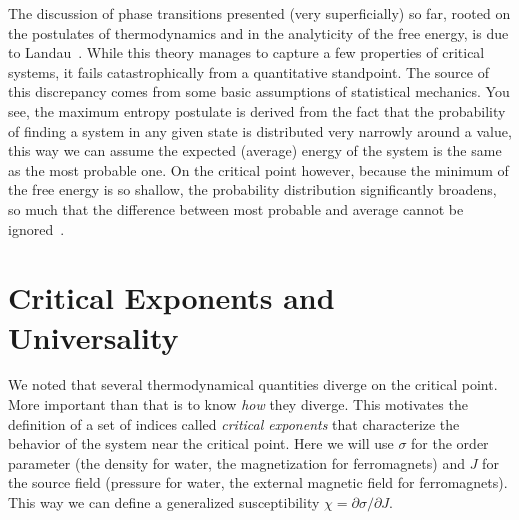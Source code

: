 The discussion of phase transitions presented (very superficially) so far,
rooted on the postulates of thermodynamics and in the analyticity of the free
energy, is due to Landau~\cite{Landau1969}. While this theory manages to
capture a few properties of critical systems, it fails catastrophically from a
quantitative standpoint. The source of this discrepancy comes from some basic
assumptions of statistical mechanics. You see, the maximum entropy postulate is
derived from the fact that the probability of finding a system in any given
state is distributed very narrowly around a value, this way we can assume the
expected (average) energy of the system is the same as the most probable one.
On the critical point however, because the minimum of the free energy is so
shallow, the probability distribution significantly broadens, so much that the
difference between most probable and average cannot be
ignored~\cite{Callen1985}.


\section{Critical Exponents and Universality}
\label{sec:universality}
\newcommand{\op}{\sigma}
\newcommand{\sfi}{J}

We noted that several thermodynamical quantities diverge on the critical point.
More important than that is to know \textit{how} they diverge. This motivates
the definition of a set of indices called \textit{critical exponents} that
characterize the behavior of the system near the critical point. Here we will
use $\op$ for the order parameter (the density for water, the magnetization for
ferromagnets) and $\sfi$ for the source field (pressure for water, the external
magnetic field for ferromagnets). This way we can define a generalized
susceptibility $\chi=\partial\op/\partial \sfi$.

